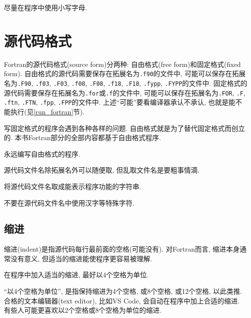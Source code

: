 \begin{convention}
    尽量在程序中使用小写字母.
\end{convention}

\section{源代码格式}

Fortran的源代码格式(source form)分两种: 自由格式(free form)和固定格式(fixed form). 自由格式的源代码需要保存在拓展名为\texttt{.f90}的文件中, 可能可以保存在拓展名为\texttt{.F90}, \texttt{.f03}, \texttt{.F03}, \texttt{.f08}, \texttt{.F08}, \texttt{.f18}, \texttt{.F18}, \texttt{.fypp}, \texttt{.FYPP}的文件中. 固定格式的源代码需要保存在拓展名为\texttt{.for}或\texttt{.f}的文件中, 可能可以保存在拓展名为\texttt{.FOR}, \texttt{.F}, \texttt{.ftn}, \texttt{.FTN}, \texttt{.fpp}, \texttt{.FPP}的文件中. 上述``可能''要看编译器承认不承认, 也就是能不能执行(见\ref{run_fortran}节).

写固定格式的程序会遇到各种各样的问题. 自由格式就是为了替代固定格式而创立的. 本书Fortran部分的全部内容都基于自由格式程序.

\begin{convention}
    永远编写自由格式的程序.
\end{convention}

源代码文件名除拓展名外可以随便取, 但乱取文件名是要粗事情滴.

\begin{convention}
    将源代码文件名取成能表示程序功能的字符串.
\end{convention}

\begin{convention}
    不要在源代码文件名中使用汉字等特殊字符.
\end{convention}

\subsection{缩进}

缩进(indent)是指源代码每行最前面的空格(可能没有). 对Fortran而言, 缩进本身通常没有意义, 但适当的缩进能使程序更容易被理解.

\begin{convention}\label{fortran_indent}
    在程序中加入适当的缩进, 最好以$4$个空格为单位.
\end{convention}

``以4个空格为单位'', 是指保持缩进为4个空格, 或8个空格, 或12个空格, 以此类推. 合格的文本编辑器(text editor), 比如VS Code, 会自动在程序中加上合适的缩进. 有些人可能更喜欢以2个空格或8个空格为单位的缩进.


